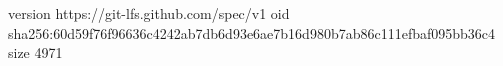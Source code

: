 version https://git-lfs.github.com/spec/v1
oid sha256:60d59f76f96636c4242ab7db6d93e6ae7b16d980b7ab86c111efbaf095bb36c4
size 4971
